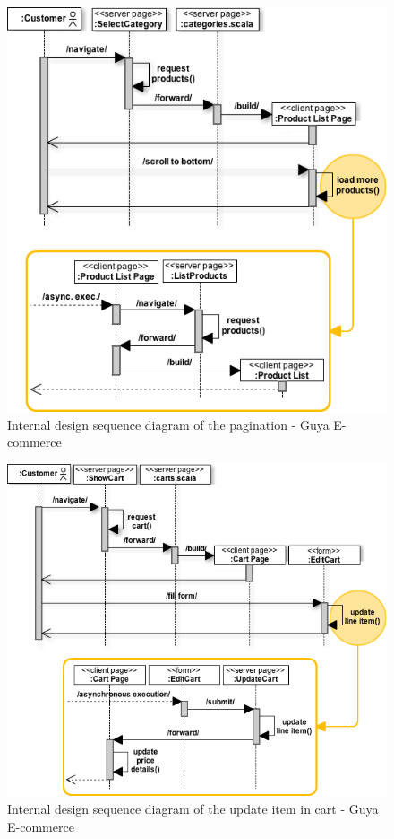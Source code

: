 \begin{figure}[!h]
\center
\includegraphics[keepaspectratio, width=15cm]{sequence-diagrams/pagination.png}
\caption{Internal design sequence diagram of the pagination - Guya E-commerce}
\end{figure}

\begin{figure}[!h]
\center
\includegraphics[keepaspectratio, width=15cm]{sequence-diagrams/update-cart.png}
\caption{Internal design sequence diagram of the update item in cart - Guya E-commerce}
\end{figure}

